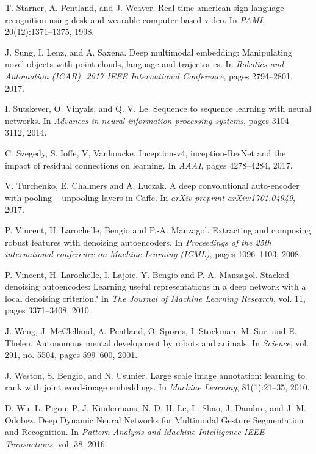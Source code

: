 \begin{thebibliography}{99}
{
  T. Starner, A. Pentland, and J. Weaver. Real-time american sign language
  recognition using desk and wearable computer based video. 
  In \textit{PAMI}, 20(12):1371–1375, 1998.

  J. Sung, I. Lenz, and A. Saxena. Deep multimodal embedding:
  Manipulating novel objects with point-clouds, language and trajectories.
  In \textit{Robotics and Automation (ICAR), 2017 IEEE International
  Conference}, pages 2794--2801, 2017.

  I. Sutskever, O. Vinyals, and Q. V. Le. Sequence to sequence learning
  with neural networks. In \textit{Advances in neural information
  processing systems}, pages 3104--3112, 2014.

  C. Szegedy, S. Ioffe, V, Vanhoucke. Inception-v4, inception-ResNet and the
  impact of residual connections on learning. In \textit{AAAI},
  pages 4278--4284, 2017.

  V. Turchenko, E. Chalmers and A. Luczak. A deep convolutional auto-encoder
  with pooling -- unpooling layers in Caffe. In \textit{arXiv preprint
  arXiv:1701.04949}, 2017.

  P. Vincent, H. Larochelle, Bengio and P.-A. Manzagol.
  Extracting and composing robust features with denoising autoencoders.
  In \textit{Proceedings of the 25th international conference
  on Machine Learning (ICML)}, pages 1096--1103; 2008.

  P. Vincent, H. Larochelle, I. Lajoie, Y. Bengio and P.-A. Manzagol.
  Stacked denoising autoencodes: Learning useful representations in a
  deep network with a local denoising criterion? In \textit{The Journal
  of Machine Learning Research}, vol. 11, pages 3371--3408, 2010.

  J. Weng, J. McClelland, A. Pentland, O. Sporns, I. Stockman, M. Sur,
  and E. Thelen. Autonomous mental development by robots and animals.
  In \textit{Science}, vol. 291, no. 5504, pages 599–600, 2001.

  J. Weston, S. Bengio, and N. Usunier. 
  Large scale image annotation: learning to rank with joint word-image
  embeddings. In \textit{Machine Learning}, 81(1):21--35, 2010.

  D. Wu, L. Pigou, P.-J. Kindermans, N. D.-H. Le, L. Shao,
  J. Dambre, and J.-M. Odobez. 
  Deep Dynamic Neural Networks for Multimodal Gesture Segmentation and
  Recognition. In \textit{Pattern Analysis and Machine Intelligence
  IEEE Transactions}, vol. 38, 2016.

}
\end{thebibliography}
